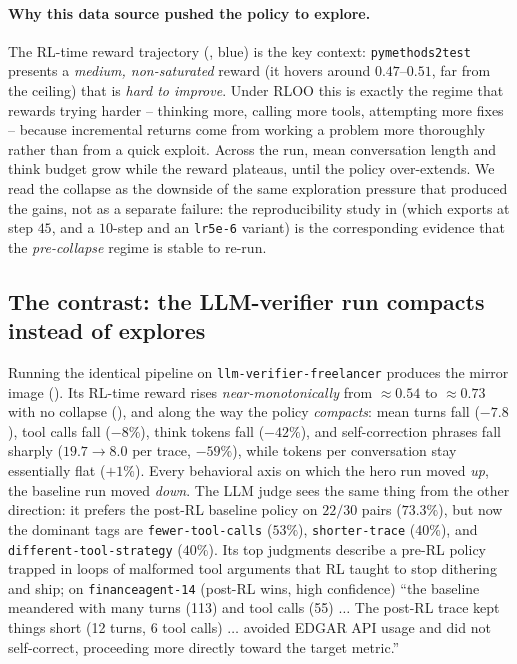 \documentclass{llmxive}
\begin{document}
\paragraph{Why this data source pushed the policy to explore.}
The RL-time reward trajectory (, blue) is the key context: \texttt{pymethods2test} presents a \emph{medium, non-saturated} reward (it hovers around $0.47$--$0.51$, far from the ceiling) that is \emph{hard to improve}. Under RLOO this is exactly the regime that rewards trying harder -- thinking more, calling more tools, attempting more fixes -- because incremental returns come from working a problem more thoroughly rather than from a quick exploit. Across the run, mean conversation length and think budget grow while the reward plateaus, until the policy over-extends. We read the collapse as the downside of the same exploration pressure that produced the gains, not as a separate failure: the reproducibility study in  (which exports at step $45$, and a $10$-step and an \texttt{lr5e-6} variant) is the corresponding evidence that the \emph{pre-collapse} regime is stable to re-run.

\subsection{The contrast: the LLM-verifier run compacts instead of explores}
\label{app:rl-behavior-baseline}



Running the identical pipeline on \texttt{llm-verifier-freelancer} produces the mirror image (). Its RL-time reward rises \emph{near-monotonically} from $\approx 0.54$ to $\approx 0.73$ with no collapse (), and along the way the policy \emph{compacts}: mean turns fall ($-7.8$), tool calls fall ($-8\%$), think tokens fall ($-42\%$), and self-correction phrases fall sharply ($19.7\!\to\!8.0$ per trace, $-59\%$), while tokens per conversation stay essentially flat ($+1\%$). Every behavioral axis on which the hero run moved \emph{up}, the baseline run moved \emph{down}. The LLM judge sees the same thing from the other direction: it prefers the post-RL baseline policy on $22/30$ pairs ($73.3\%$), but now the dominant tags are \texttt{fewer-tool-calls} ($53\%$), \texttt{shorter-trace} ($40\%$), and \texttt{different-tool-strategy} ($40\%$). Its top judgments describe a pre-RL policy trapped in loops of malformed tool arguments that RL taught to stop dithering and ship; on \texttt{financeagent-14} (post-RL wins, high confidence) ``the baseline meandered with many turns (113) and tool calls (55) $\dots$ The post-RL trace kept things short (12 turns, 6 tool calls) $\dots$ avoided EDGAR API usage and did not self-correct, proceeding more directly toward the target metric.''
\end{document}
